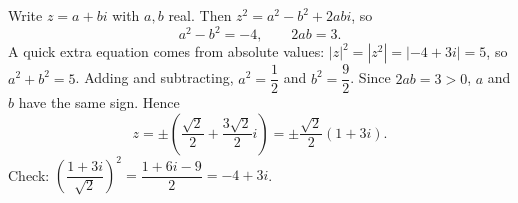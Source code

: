 Write $z=a+bi$ with $a,b$ real. Then $z^2=a^2-b^2+2abi$, so
\[a^2-b^2=-4,\qquad 2ab=3 .\]
A quick extra equation comes from absolute values: $|z|^2=|z^2|=\left|-4+3i\right|=5$, so $a^2+b^2=5$. Adding and subtracting, $a^2=\dfrac{1}{2}$ and $b^2=\dfrac{9}{2}$. Since $2ab=3>0$, $a$ and $b$ have the same sign. Hence
\[z=\pm\left(\dfrac{\sqrt2}{2}+\dfrac{3\sqrt2}{2}i\right)=\boxed{\pm\dfrac{\sqrt2}{2}(1+3i)}.\]
Check: $\left(\dfrac{1+3i}{\sqrt2}\right)^2=\dfrac{1+6i-9}{2}=-4+3i$.
